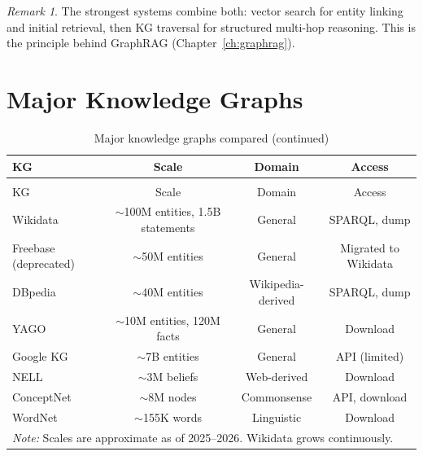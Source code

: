 \documentclass[11pt,a4paper,oneside,openany]{book}
\theoremstyle{definition}
\theoremstyle{plain}
\theoremstyle{remark}
\newtheorem{remark}{Remark}[chapter]
\begin{document}
\begin{remark}
	The strongest systems combine both: vector search for entity linking and initial retrieval, then KG traversal for structured multi-hop reasoning. This is the principle behind GraphRAG (Chapter~\ref{ch:graphrag}).
\end{remark}

\section{Major Knowledge Graphs}\label{sec:major-kgs}

\begin{longtable}{lccc}
	\caption{Major knowledge graphs compared}
	\label{tab:major-kgs}                                                                                   \\
	\toprule
	KG                    & Scale                                & Domain            & Access               \\
	\midrule
	\endfirsthead
	\caption[]{Major knowledge graphs compared (continued)}                                                 \\
	\toprule
	KG                    & Scale                                & Domain            & Access               \\
	\midrule
	\endhead
	\bottomrule
	\endfoot
	Wikidata              & $\sim$100M entities, 1.5B statements & General           & SPARQL, dump         \\
	Freebase (deprecated) & $\sim$50M entities                   & General           & Migrated to Wikidata \\
	DBpedia               & $\sim$40M entities                   & Wikipedia-derived & SPARQL, dump         \\
	YAGO                  & $\sim$10M entities, 120M facts       & General           & Download             \\
	Google KG             & $\sim$7B entities                    & General           & API (limited)        \\
	NELL                  & $\sim$3M beliefs                     & Web-derived       & Download             \\
	ConceptNet            & $\sim$8M nodes                       & Commonsense       & API, download        \\
	WordNet               & $\sim$155K words                     & Linguistic        & Download             \\
	\hline
	\multicolumn{4}{l}{\small\textit{Note:} Scales are approximate as of 2025--2026. Wikidata grows continuously.}
\end{longtable}
\end{document}
